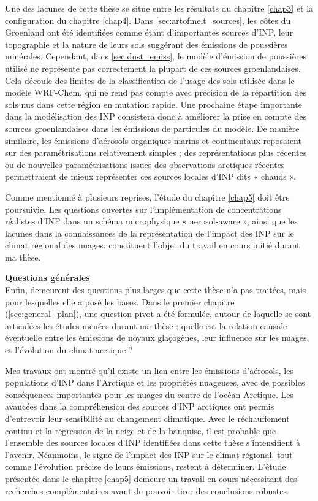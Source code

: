 Une des lacunes de cette thèse se situe entre les résultats du chapitre \ref{chap3} et la configuration du chapitre \ref{chap4}.  
Dans \cref{sec:artofmelt_sources}, les côtes du Groenland ont été identifiées comme étant d’importantes sources d’INP, leur topographie et la nature de leurs sols suggérant des émissions de poussières minérales.  
Cependant, dans \cref{sec:dust_emiss}, le modèle d’émission de poussières utilisé ne représente pas correctement la plupart de ces sources groenlandaises.  
Cela découle des limites de la classification de l'usage des sols utilisée dans le modèle WRF-Chem, qui ne rend pas compte avec précision de la répartition des sols nus dans cette région en mutation rapide.  
Une prochaine étape importante dans la modélisation des INP consistera donc à améliorer la prise en compte des sources groenlandaises dans les émissions de particules du modèle.  
De manière similaire, les émissions d’aérosols organiques marins et continentaux reposaient sur des paramétrisations relativement simples ; des représentations plus récentes ou de nouvelles paramétrisations issues des observations arctiques récentes permettraient de mieux représenter ces sources locales d’INP dits « chauds ».

Comme mentionné à plusieurs reprises, l’étude du chapitre \ref{chap5} doit être poursuivie.  
Les questions ouvertes sur l’implémentation de concentrations réalistes d’INP dans un schéma microphysique « aerosol-aware », ainsi que les lacunes dans la connaissances de la représentation de l’impact des INP sur le climat régional des nuages, constituent l'objet du travail en cours initié durant ma thèse.

\vspace{\baselineskip}
\textbf{Questions générales}\\
Enfin, demeurent des questions plus larges que cette thèse n’a pas traitées, mais pour lesquelles elle a posé les bases.  
Dans le premier chapitre (\cref{sec:general_plan}), une question pivot a été formulée, autour de laquelle se sont articulées les études menées durant ma thèse :  
quelle est la relation causale éventuelle entre les émissions de noyaux glaçogènes, leur influence sur les nuages, et l’évolution du climat arctique ?

Mes travaux ont montré qu’il existe un lien entre les émissions d’aérosols, les populations d’INP dans l’Arctique et les propriétés nuageuses, avec de possibles conséquences importantes pour les nuages du centre de l’océan Arctique.  
Les avancées dans la compréhension des sources d’INP arctiques ont permis d’entrevoir leur sensibilité au changement climatique.  
Avec le réchauffement continu et la régression de la neige et de la banquise, il est probable que l’ensemble des sources locales d’INP identifiées dans cette thèse s’intensifient à l’avenir.  
Néanmoins, le signe de l’impact des INP sur le climat régional, tout comme l’évolution précise de leurs émissions, restent à déterminer.  
L’étude présentée dans le chapitre \ref{chap5} demeure un travail en cours nécessitant des recherches complémentaires avant de pouvoir tirer des conclusions robustes.

